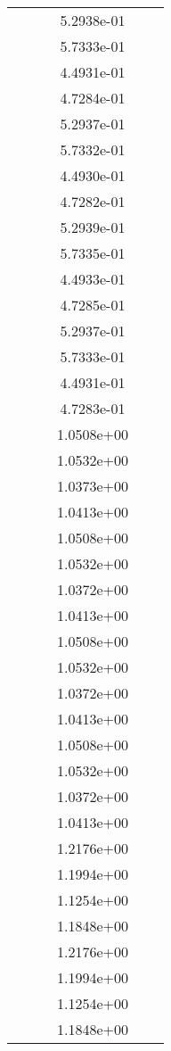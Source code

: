 \begin{xltabular}{\textwidth}{r|rS[table-format=1.3e+2]S[table-format=1.4e+2]S[table-format=1.4e+2]S[table-format=-1.5]}
&  &  & 5.2938e-01 & & \\
&  &  & 5.7333e-01 & & \\
&  &  & 4.4931e-01 & & \\
&  &  & 4.7284e-01 & & \\
&  &  & 5.2937e-01 & & \\
&  &  & 5.7332e-01 & & \\
&  &  & 4.4930e-01 & & \\
&  &  & 4.7282e-01 & & \\
&  &  & 5.2939e-01 & & \\
&  &  & 5.7335e-01 & & \\
&  &  & 4.4933e-01 & & \\
&  &  & 4.7285e-01 & & \\
&  &  & 5.2937e-01 & & \\
&  &  & 5.7333e-01 & & \\
&  &  & 4.4931e-01 & & \\
&  &  & 4.7283e-01 & & \\
&  &  & 1.0508e+00 & & \\
&  &  & 1.0532e+00 & & \\
&  &  & 1.0373e+00 & & \\
&  &  & 1.0413e+00 & & \\
&  &  & 1.0508e+00 & & \\
&  &  & 1.0532e+00 & & \\
&  &  & 1.0372e+00 & & \\
&  &  & 1.0413e+00 & & \\
&  &  & 1.0508e+00 & & \\
&  &  & 1.0532e+00 & & \\
&  &  & 1.0372e+00 & & \\
&  &  & 1.0413e+00 & & \\
&  &  & 1.0508e+00 & & \\
&  &  & 1.0532e+00 & & \\
&  &  & 1.0372e+00 & & \\
&  &  & 1.0413e+00 & & \\
&  &  & 1.2176e+00 & & \\
&  &  & 1.1994e+00 & & \\
&  &  & 1.1254e+00 & & \\
&  &  & 1.1848e+00 & & \\
&  &  & 1.2176e+00 & & \\
&  &  & 1.1994e+00 & & \\
&  &  & 1.1254e+00 & & \\
&  &  & 1.1848e+00 & & \\

\end{xltabular}
